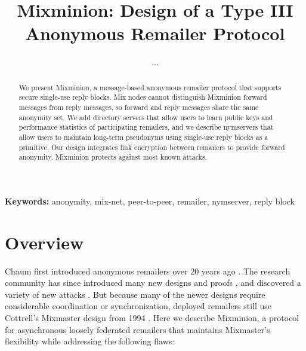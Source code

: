 \documentclass[11pt]{IEEEtran}
\newcommand\emailaddr{\begingroup \def\UrlLeft{<}\def\UrlRight{>}\urlstyle{tt}\Url}
\begin{document}

\title{Mixminion: Design of a Type III Anonymous Remailer Protocol}

% 
\author{...}

\maketitle
\pagestyle{plain} 
 
\begin{abstract}

We present Mixminion, a message-based anonymous remailer protocol that
supports secure single-use reply blocks. Mix nodes cannot distinguish
Mixminion forward messages from reply messages, so forward and reply
messages share
the same anonymity set. We add directory servers that allow users to
learn public keys and performance statistics of participating remailers,
and we describe nymservers that allow users to maintain long-term
pseudonyms using single-use reply blocks as a primitive. Our design
integrates link encryption between remailers to provide
forward anonymity. Mixminion %
protects against most known attacks.

\end{abstract}

\noindent \textbf{Keywords:} anonymity, mix-net, peer-to-peer, remailer, nymserver, reply block


\section{Overview}
\label{sec:intro}

Chaum first introduced anonymous remailers over 20 years ago
\cite{chaum-mix}. The research community has since introduced many new
designs and proofs \cite{abe,babel,flash-mix,kesdogan,shuffle,hybrid-mix},
and discovered a variety of new attacks
\cite{back-traffic-analysis,langos02,disad-free-routes,desmedt,mitkuro,raymond00}.
But because many of the newer designs require considerable coordination or
synchronization, deployed remailers still use Cottrell's Mixmaster
design from 1994 \cite{mixmaster-attacks,mixmaster-spec}. Here we describe
Mixminion, a protocol for asynchronous loosely federated remailers that
maintains Mixmaster's flexibility while addressing the following flaws:
\end{document}
